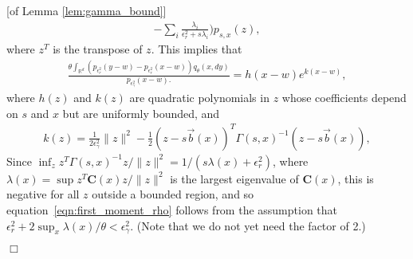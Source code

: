 \documentclass[12pt]{article}
\newenvironment {proof}{{\noindent\bf Proof }}{\hfill $\Box$ \medskip}
\newcommand{\IR}{\mathbb R}
\newcommand{\meanq}{\vec b}    %
\newcommand{\covq}{\mathbf{C}}     %
\numberwithin{equation}{section}
\begin{document}
\begin{proof}[of Lemma \ref{lem:gamma_bound}]
\begin{align*}
            -
            \sum_i \frac{\lambda_i}{\epsilon_r^2 + s \lambda_i}
        \bigg)
        p_{s, x}(z) ,
    \end{align*}
    where $z^T$ is the transpose of $z$.
    This implies that
    \begin{align*}
        \frac{
        \theta
            \int_{\IR^d}
                ( p_{\epsilon_r^2}(y-w) - p_{\epsilon_r^2}(x-w) )
            q_\theta(x, dy)
        }{
            p_{\epsilon^2_\gamma}(x-w) .
        }
        =
        h(x-w) e^{k(x-w)},
    \end{align*}
    where $h(z)$ and $k(z)$ are quadratic polynomials in $z$
    whose coefficients depend on $s$ and $x$ but are uniformly bounded,
    and
    \begin{align*}
        k(z)
        =
        \frac{1}{2\epsilon_\gamma^2} \|z\|^2
        -\frac{1}{2} (z - s\meanq(x))^T \Gamma(s,x)^{-1} (z - s\meanq(x)) ,
    \end{align*}
    Since $\inf_z z^T \Gamma(s,x)^{-1} z / \|z\|^2 = 1 / (s \lambda(x) + \epsilon_r^2)$,
    where $\lambda(x) = \sup z^T \covq(x) z / \|z\|^2$ is the largest eigenvalue of $\covq(x)$,
    this is negative for all $z$ outside a bounded region, and so
    equation~\eqref{eqn:first_moment_rho} follows from the assumption
    that $\epsilon_r^2 + 2 \sup_x \lambda(x)/\theta < \epsilon_\gamma^2$.
    (Note that we do not yet need the factor of 2.)


\end{proof}
\end{document}
